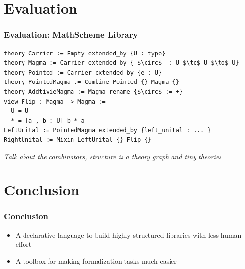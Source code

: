 \documentclass[t,12pt,numbers,fleqn,usenames,xcolor=dvipsnames]{beamer}
\begin{document}
\section{Evaluation}
\begin{frame}[fragile]
\frametitle{Evaluation: MathScheme Library}
\scriptsize	
\begin{lstlisting}
theory Carrier := Empty extended_by {U : type}
theory Magma := Carrier extended_by {_$\circ$_ : U $\to$ U $\to$ U}
theory Pointed := Carrier extended_by {e : U}
theory PointedMagma := Combine Pointed {} Magma {}
theory AddtivieMagma := Magma rename {$\circ$ := +}
view Flip : Magma -> Magma := 
  U = U 
  * = [a , b : U] b * a 
LeftUnital := PointedMagma extended_by {left_unital : ... }
RightUnital := Mixin LeftUnital {} Flip {}     
\end{lstlisting}

\textit{Talk about the combinators, structure is a theory graph and tiny theories}
\end{frame}

\section{Conclusion}
\begin{frame}[fragile]
\frametitle{Conclusion}
\begin{itemize}
	\item A declarative language to build highly structured libraries with less human effort 
	\item A toolbox for making formalization tasks much easier 
\end{itemize}
\end{frame}
\end{document}
